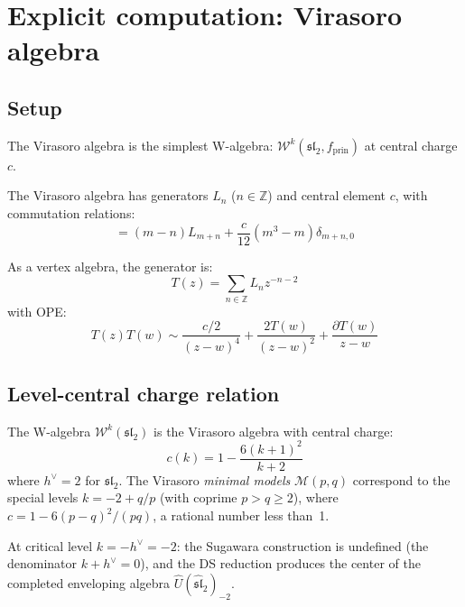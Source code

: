 \section{Explicit computation: Virasoro algebra}

\subsection{Setup}

The Virasoro algebra is the simplest W-algebra: $\mathcal{W}^k(\mathfrak{sl}_2, f_{\text{prin}})$ at central charge $c$.

\begin{definition}
The Virasoro algebra has generators $L_n$ ($n \in \mathbb{Z}$) and central element $c$, with commutation relations:
\begin{equation}
[L_m, L_n] = (m-n) L_{m+n} + \frac{c}{12}(m^3 - m)\delta_{m+n,0}
\end{equation}

As a vertex algebra, the generator is:
\begin{equation}
T(z) = \sum_{n \in \mathbb{Z}} L_n z^{-n-2}
\end{equation}
with OPE:
\begin{equation}
T(z)T(w) \sim \frac{c/2}{(z-w)^4} + \frac{2T(w)}{(z-w)^2} + \frac{\partial T(w)}{z-w}
\end{equation}
\end{definition}

\subsection{Level-central charge relation}

\begin{proposition}
\label{prop:virasoro-from-sl2}
The W-algebra $\mathcal{W}^k(\mathfrak{sl}_2)$ is the Virasoro algebra with central charge:
\begin{equation}
c(k) = 1 - \frac{6(k+1)^2}{k+2}
\end{equation}
where $h^\vee = 2$ for $\mathfrak{sl}_2$. The Virasoro \emph{minimal models} $\mathcal{M}(p,q)$
correspond to the special levels $k = -2 + q/p$ (with coprime $p > q \geq 2$),
where $c = 1 - 6(p-q)^2/(pq)$, a rational number less than~1.

At critical level $k = -h^\vee = -2$: the Sugawara construction is undefined
(the denominator $k + h^\vee = 0$), and the DS reduction produces the center of
the completed enveloping algebra $\widehat{U}(\widehat{\mathfrak{sl}}_2)_{-2}$.
\end{proposition}

